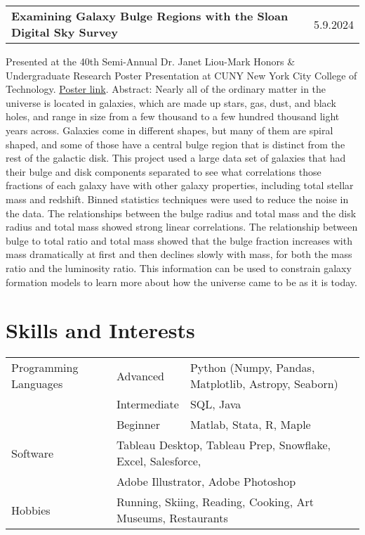 \documentclass[a4paper,12pt]{article}
\makeatletter
\newenvironment{jobshort}[2]
    {
    \begin{tabularx}{\linewidth}{@{}X r@{}}
    {\raggedright\arraybackslash\nohyphens{#1}} & #2 \\[3.75pt]
    \end{tabularx}
    }
    {}
\makeatother
\begin{document}
\begin{jobshort}{\textbf{Examining Galaxy Bulge Regions with the Sloan Digital Sky Survey}}{5.9.2024}
Presented at the 40th Semi-Annual Dr. Janet Liou-Mark Honors \& Undergraduate Research Poster Presentation at CUNY New York City College of Technology. \href{https://academicworks.cuny.edu/ny_pubs/1137/}{Poster link}. Abstract: Nearly all of the ordinary matter in the universe is located in galaxies, which are made up stars, gas, dust, and black holes, and range in size from a few thousand to a few hundred thousand light years across. Galaxies come in different shapes, but many of them are spiral shaped, and some of those have a central bulge region that is distinct from the rest of the galactic disk. This project used a large data set of galaxies that had their bulge and disk components separated to see what correlations those fractions of each galaxy have with other galaxy properties, including total stellar mass and redshift. Binned statistics techniques were used to reduce the noise in the data. The relationships between the bulge radius and total mass and the disk radius and total mass showed strong linear correlations. The relationship between bulge to total ratio and total mass showed that the bulge fraction increases with mass dramatically at first and then declines slowly with mass, for both the mass ratio and the luminosity ratio. This information can be used to constrain galaxy formation models to learn more about how the universe came to be as it is today.
\end{jobshort}

\section{Skills and Interests}
\begin{tabularx}{\linewidth}{@{}l l X@{}}
Programming Languages & Advanced & \normalsize{Python (Numpy, Pandas, Matplotlib, Astropy, Seaborn)}\\
 & Intermediate & \normalsize{SQL, Java}\\
 & Beginner & \normalsize{Matlab, Stata, R, Maple}\\
Software & \multicolumn{2}{l}{\normalsize{Tableau Desktop, Tableau Prep, Snowflake, Excel, Salesforce, }}\\
& \multicolumn{2}{l}{\normalsize{Adobe Illustrator, Adobe Photoshop}}\\
Hobbies & \multicolumn{2}{l}{\normalsize{Running, Skiing, Reading, Cooking, Art Museums, Restaurants}}\\

\end{tabularx}

\vfill
{}
\end{document}
